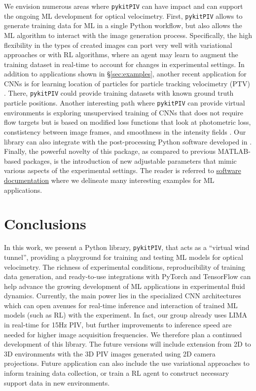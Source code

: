 \documentclass[a4paper,fleqn]{cas-dc}
\begin{document}
We envision numerous areas where \texttt{pykitPIV} can have impact and can support the ongoing ML development for optical velocimetry. First, \texttt{pykitPIV} allows to generate training data for ML in a single Python workflow, but also allows the ML algorithm to interact with the image generation process. Specifically, the high flexibility in the types of created images can port very well with variational approaches or with RL algorithms, where an agent may learn to augment the training dataset in real-time to account for changes in experimental settings.
In addition to applications shown in \S\ref{sec:examples}, another recent application for CNNs is for learning location of particles for particle tracking velocimetry (PTV) \cite{godbersen2024peak}. There, \texttt{pykitPIV} could provide training datasets with known ground truth particle positions.
Another interesting path where \texttt{pykitPIV} can provide virtual environments is exploring unsupervised training of CNNs that does not require flow targets but is based on modified loss functions that look at photometric loss, constistency between image frames, and smoothness in the intensity fields \cite{lagemann2024challenges}. Our library can also integrate with the post-processing Python software developed in \cite{aguilar2022dpivsoft}. Finally, the powerful novelty of this package, as compared to previous MATLAB-based packages, is the introduction of new adjustable parameters that mimic various aspects of the experimental settings. The reader is referred to \href{https://pykitpiv.readthedocs.com}{software documentation} where we delineate many interesting examples for ML applications.

\section{Conclusions}

In this work, we present a Python library, \texttt{pykitPIV}, that acts as a ``virtual wind tunnel'', providing a playground for training and testing ML models for optical velocimetry. The richness of experimental conditions, reproducibility of training data generation, and ready-to-use integrations with PyTorch and TensorFlow can help advance the growing development of ML applications in experimental fluid dynamics. Currently, the main power lies in the specialized CNN architectures which can open avenues for real-time inference and interaction of trained ML models (such as RL) with the experiment. In fact, our group already uses LIMA in real-time for 15Hz PIV, but further improvements to inference speed are needed for higher image acquisition frequencies.
We therefore plan a continued development of this library. The future versions will include extension from 2D to 3D environments with the 3D PIV images generated using 2D camera projections. Future application can also include the use variational approaches to inform training data collection, or train a RL agent to construct necessary support data in new environments.
\end{document}
